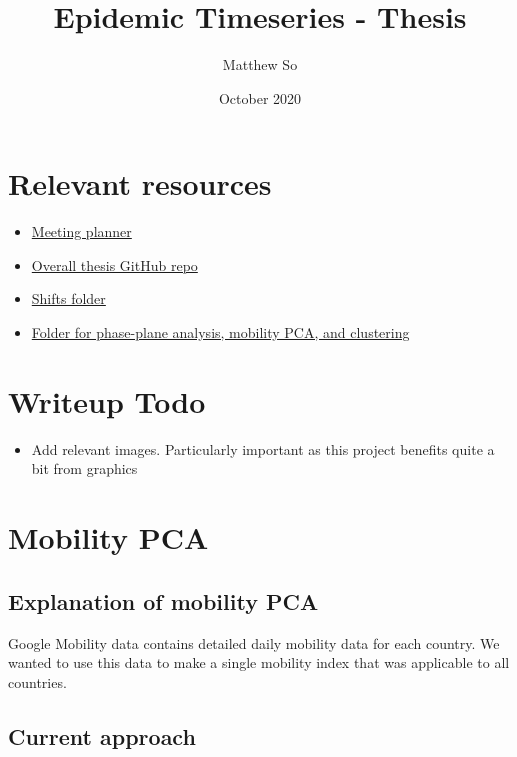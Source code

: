 \documentclass{article}
\title{Epidemic Timeseries - Thesis}
\author{Matthew So}
\date{October 2020}
\begin{document}
\maketitle

\tableofcontents


\section{Relevant resources}

\begin{itemize}
    \item \hyperlink{https://docs.google.com/document/d/105QZAGMzl7m6JZiXGLuycXWrZcsydqJ_/edit}{Meeting planner} 
    \item \hyperlink{https://github.com/Apeirogons/COVID-math-thesis}{Overall thesis GitHub repo}
    \item \hyperlink{https://github.com/Apeirogons/COVID-math-thesis/tree/master/shifts}{Shifts folder}
    \item \hyperlink{https://github.com/Apeirogons/COVID-math-thesis/tree/master/epidemic_timeseries}{Folder for phase-plane analysis, mobility PCA, and clustering}    
\end{itemize}


\section{Writeup Todo}
\begin{itemize}
    \item Add relevant images. Particularly important as this project benefits quite a bit from graphics
    
\end{itemize}

\section{Mobility PCA}
\subsection{Explanation of mobility PCA}
Google Mobility data contains detailed daily mobility data for each country. We wanted to use this data to make a single mobility index that was applicable to all countries.

\subsection{Current approach}
\end{document}
